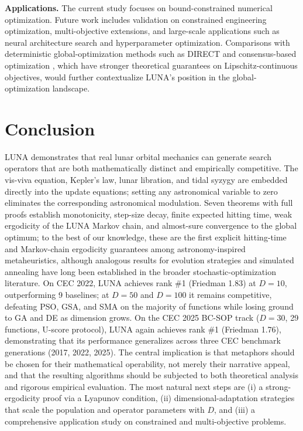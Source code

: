 \documentclass[review]{elsarticle}
\theoremstyle{definition}
\begin{document}
\textbf{Applications.} The current study focuses on bound-constrained numerical optimization. Future work includes validation on constrained engineering optimization, multi-objective extensions, and large-scale applications such as neural architecture search and hyperparameter optimization. Comparisons with deterministic global-optimization methods such as DIRECT \cite{amcrec12} and consensus-based optimization \cite{amcrec13}, which have stronger theoretical guarantees on Lipschitz-continuous objectives, would further contextualize LUNA's position in the global-optimization landscape.

\section{Conclusion}
\label{sec:conclusion}

LUNA demonstrates that real lunar orbital mechanics can generate search operators that are both mathematically distinct and empirically competitive. The vis-viva equation, Kepler's law, lunar libration, and tidal syzygy are embedded directly into the update equations; setting any astronomical variable to zero eliminates the corresponding astronomical modulation. Seven theorems with full proofs establish monotonicity, step-size decay, finite expected hitting time, weak ergodicity of the LUNA Markov chain, and almost-sure convergence to the global optimum; to the best of our knowledge, these are the first explicit hitting-time and Markov-chain ergodicity guarantees among astronomy-inspired metaheuristics, although analogous results for evolution strategies and simulated annealing have long been established in the broader stochastic-optimization literature. On CEC 2022, LUNA achieves rank \#1 (Friedman 1.83) at $D=10$, outperforming 9 baselines; at $D=50$ and $D=100$ it remains competitive, defeating PSO, GSA, and SMA on the majority of functions while losing ground to GA and DE as dimension grows. On the CEC 2025 BC-SOP track ($D=30$, 29 functions, U-score protocol), LUNA again achieves rank \#1 (Friedman 1.76), demonstrating that its performance generalizes across three CEC benchmark generations (2017, 2022, 2025). The central implication is that metaphors should be chosen for their mathematical operability, not merely their narrative appeal, and that the resulting algorithms should be subjected to both theoretical analysis and rigorous empirical evaluation. The most natural next steps are (i) a strong-ergodicity proof via a Lyapunov condition, (ii) dimensional-adaptation strategies that scale the population and operator parameters with $D$, and (iii) a comprehensive application study on constrained and multi-objective problems.
\end{document}
